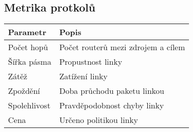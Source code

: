 \subsection{Metrika protkolů}
\begin{tabularx}{\linewidth}{l|l}
    \textbf{Parametr} & \textbf{Popis}                     \\
    \hline
    Počet hopů        & Počet routerů mezi zdrojem a cílem \\
    \hline
    Šířka pásma       & Propustnost linky                  \\
    \hline
    Zátěž             & Zatížení linky                     \\
    \hline
    Zpoždění          & Doba průchodu paketu linkou        \\
    \hline
    Spolehlivost      & Pravděpodobnost chyby linky        \\
    \hline
    Cena              & Určeno politikou linky             \\
\end{tabularx}
